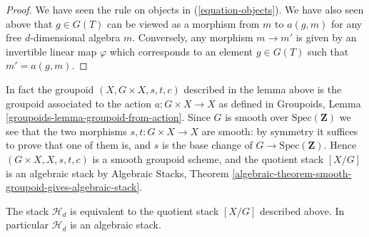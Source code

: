 \begin{proof}
We have seen the rule on objects in (\ref{equation-objects}).
We have also seen above that $g \in G(T)$ can be viewed as
a morphism from $m$ to $a(g, m)$ for any free $d$-dimensional algebra $m$.
Conversely, any morphism $m \to m'$ is given by an invertible linear
map $\varphi$ which corresponds to an element $g \in G(T)$ such
that $m' = a(g, m)$.
\end{proof}

\noindent
In fact the groupoid $(X, G \times X, s, t, c)$ described in the
lemma above is the groupoid associated to the action $a : G \times X \to X$
as defined in
Groupoids, Lemma \ref{groupoids-lemma-groupoid-from-action}.
Since $G$ is smooth over $\text{Spec}(\mathbf{Z})$
we see that the two morphisms $s, t : G \times X \to X$ are
smooth: by symmetry it suffices to prove that one of them is, and
$s$ is the base change of $G \to \text{Spec}(\mathbf{Z})$.
Hence $(G \times X, X, s, t, c)$ is a smooth groupoid scheme,
and the quotient stack $[X/G]$ is an algebraic stack by
Algebraic Stacks, 
Theorem \ref{algebraic-theorem-smooth-groupoid-gives-algebraic-stack}.

\begin{proposition}
\label{proposition-finite-hilbert-point}
The stack $\mathcal{H}_d$ is equivalent to the quotient stack
$[X/G]$ described above. In particular $\mathcal{H}_d$ is an
algebraic stack.
\end{proposition}

